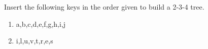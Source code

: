 Insert the following keys in the order given to build a 2-3-4 tree.

\begin{enumerate}
  \item  a,b,c,d,e,f,g,h,i,j
    \item  i,l,u,v,t,r,e,s
\end{enumerate}
